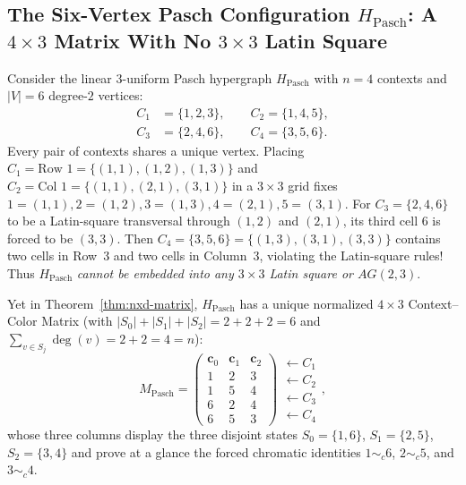 \documentclass[aps,pra,reprint,superscriptaddress,longbibliography,nofootinbib,floatfix,10pt]{revtex4-2}
\theoremstyle{definition}\newtheorem{definition}[theorem]{Definition}
\theoremstyle{remark}\newtheorem{remark}[theorem]{Remark}
\begin{document}
\begin{itemize}
\end{itemize}

\subsection{The Six-Vertex Pasch Configuration \texorpdfstring{$H_{\mathrm{Pasch}}$}{HPasch}: A \texorpdfstring{$4\times 3$}{4x3} Matrix With No \texorpdfstring{$3\times 3$}{3x3} Latin Square}\label{sec:pasch}

Consider the linear $3$-uniform Pasch hypergraph $H_{\mathrm{Pasch}}$ with $n=4$ contexts and $|V|=6$ degree-$2$ vertices:
\begin{equation}\label{eq:Pasch}
\begin{aligned}
C_1&=\{1,2,3\},\qquad C_2=\{1,4,5\},\\
C_3&=\{2,4,6\},\qquad C_4=\{3,5,6\}.
\end{aligned}
\end{equation}
Every pair of contexts shares a unique vertex. Placing $C_1=\text{Row 1}=\{(1,1),(1,2),(1,3)\}$ and $C_2=\text{Col 1}=\{(1,1),(2,1),(3,1)\}$ in a $3\times 3$ grid fixes $1=(1,1),2=(1,2),3=(1,3),4=(2,1),5=(3,1)$. For $C_3=\{2,4,6\}$ to be a Latin-square transversal through $(1,2)$ and $(2,1)$, its third cell $6$ is forced to be $(3,3)$. Then $C_4=\{3,5,6\}=\{(1,3),(3,1),(3,3)\}$ contains two cells in Row~3 and two cells in Column~3, violating the Latin-square rules! Thus $H_{\mathrm{Pasch}}$ \emph{cannot be embedded into any $3\times 3$ Latin square or $AG(2,3)$}.

Yet in Theorem~\ref{thm:nxd-matrix}, $H_{\mathrm{Pasch}}$ has a unique normalized $4\times 3$ Context--Color Matrix (with $|S_0|+|S_1|+|S_2|=2+2+2=6$ and $\sum_{v\in S_j}\deg(v)=2+2=4=n$):
\begin{equation}\label{eq:Pasch-matrix}
M_{\mathrm{Pasch}}=\begin{pmatrix}
\mathbf{c}_0 & \mathbf{c}_1 & \mathbf{c}_2\\\hline
1 & 2 & 3\\
1 & 5 & 4\\
6 & 2 & 4\\
6 & 5 & 3
\end{pmatrix}\begin{array}{l}
\leftarrow C_1\\
\leftarrow C_2\\
\leftarrow C_3\\
\leftarrow C_4
\end{array},
\end{equation}
whose three columns display the three disjoint states $S_0=\{1,6\}$, $S_1=\{2,5\}$, $S_2=\{3,4\}$ and prove at a glance the forced chromatic identities $1\sim_c 6$, $2\sim_c 5$, and $3\sim_c 4$.
\end{document}

